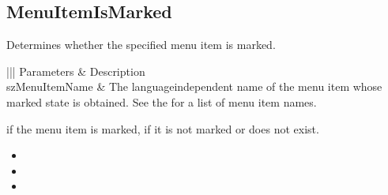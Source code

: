 \documentclass[letterpaper,12pt,english,openany,oneside]{sphinxmanual}
\begin{document}
\subsection{MenuItemIsMarked}
\label{\detokenize{IAC_API_OLE_Objects:menuitemismarked}}
Determines whether the specified menu item is marked.


\begin{sphinxVerbatim}[commandchars=\\\{\}]
  
\end{sphinxVerbatim}
\label{\detokenize{IAC_API_OLE_Objects:parameters-9}}


\begin{savenotes}\sphinxattablestart
\centering
{}\label{\detokenize{IAC_API_OLE_Objects:section-11}}\nobreak
\begin{tabular}[t]{|||}
\hline
\sphinxstyletheadfamily 
Parameters
&\sphinxstyletheadfamily 
Description
\\
\hline
szMenuItemName
&
The language\sphinxhyphen{}independent name of the menu item whose marked state is obtained. See the  for a list of menu item names.
\\
\hline
\end{tabular}
\par
\sphinxattableend\end{savenotes}


 if the menu item is marked,  if it is not marked or does not exist.

\label{\detokenize{IAC_API_OLE_Objects:related-methods-16}}
\begin{itemize}
\item {} 
 

\item {} 
 

\item {} 
 

\end{itemize}
\end{document}
